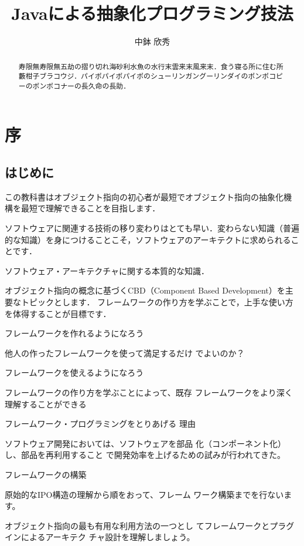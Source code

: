 \documentclass[a4j,papersize]{jsbook}
\title{Javaによる抽象化プログラミング技法}
\author{中鉢 欣秀}
\begin{document}
\maketitle

\chapter*{序}

\begin{abstract}
寿限無寿限無五劫の摺り切れ海砂利水魚の水行末雲来末風来末．食う寝る所に住む所藪柑子ブラコウジ．パイポパイポパイポのシューリンガングーリンダイのポンポコピーのポンポコナーの長久命の長助．
\end{abstract}

\section*{はじめに}

この教科書はオブジェクト指向の初心者が最短でオブジェクト指向の抽象化機
構を最短で理解できることを目指します．

ソフトウェアに関連する技術の移り変わりはとても早い．変わらない知識（普遍的な知識）を身につけることこそ，ソフトウェアのアーキテクトに求められることです．

ソフトウェア・アーキテクチャに関する本質的な知識．

オブジェクト指向の概念に基づくCBD（Component Based Development）を主要なトピックとします．
フレームワークの作り方を学ぶことで，上手な使い方を体得することが目標です．

フレームワークを作れるようになろう 

他人の作ったフレームワークを使って満足するだけ
でよいのか？ 

フレームワークを使えるようになろう 

フレームワークの作り方を学ぶことによって、既存
フレームワークをより深く理解することができる 

フレームワーク・プログラミングをとりあげる
理由 

ソフトウェア開発においては、ソフトウェアを部品
化（コンポーネント化）し、部品を再利用すること
で開発効率を上げるための試みが行われてきた。 

フレームワークの構築 

原始的なIPO構造の理解から順をおって、フレーム
ワーク構築までを行ないます。 

オブジェクト指向の最も有用な利用方法の一つとし
てフレームワークとプラグインによるアーキテク
チャ設計を理解しましょう。 
\end{document}
